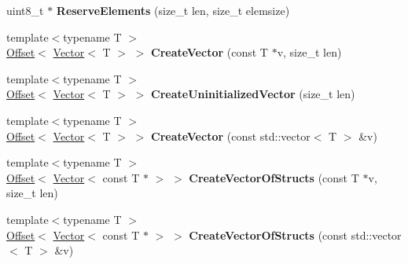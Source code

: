 \begin{DoxyCompactItemize}
uint8\+\_\+t $\ast$ {\bfseries Reserve\+Elements} (size\+\_\+t len, size\+\_\+t elemsize)
\item 
\mbox{\label{classflatbuffers_1_1FlatBufferBuilder_a2cca5c89246a53e80e6ad9487f4c36f3}} 
{\footnotesize template$<$typename T $>$ }\\\hyperlink{structflatbuffers_1_1Offset}{Offset}$<$ \hyperlink{classflatbuffers_1_1Vector}{Vector}$<$ T $>$ $>$ {\bfseries Create\+Vector} (const T $\ast$v, size\+\_\+t len)
\item 
\mbox{\label{classflatbuffers_1_1FlatBufferBuilder_ac85de2e957af13fc3a1651f1f0491952}} 
{\footnotesize template$<$typename T $>$ }\\\hyperlink{structflatbuffers_1_1Offset}{Offset}$<$ \hyperlink{classflatbuffers_1_1Vector}{Vector}$<$ T $>$ $>$ {\bfseries Create\+Uninitialized\+Vector} (size\+\_\+t len)
\item 
\mbox{\label{classflatbuffers_1_1FlatBufferBuilder_af715dd24dd37cb0151dc7a980ad0f207}} 
{\footnotesize template$<$typename T $>$ }\\\hyperlink{structflatbuffers_1_1Offset}{Offset}$<$ \hyperlink{classflatbuffers_1_1Vector}{Vector}$<$ T $>$ $>$ {\bfseries Create\+Vector} (const std\+::vector$<$ T $>$ \&v)
\item 
\mbox{\label{classflatbuffers_1_1FlatBufferBuilder_afede51fd9c32d146cbb1832f57c5e1b7}} 
{\footnotesize template$<$typename T $>$ }\\\hyperlink{structflatbuffers_1_1Offset}{Offset}$<$ \hyperlink{classflatbuffers_1_1Vector}{Vector}$<$ const T $\ast$ $>$ $>$ {\bfseries Create\+Vector\+Of\+Structs} (const T $\ast$v, size\+\_\+t len)
\item 
\mbox{\label{classflatbuffers_1_1FlatBufferBuilder_a8704709a2e25ad04679212ee4126b1a1}} 
{\footnotesize template$<$typename T $>$ }\\\hyperlink{structflatbuffers_1_1Offset}{Offset}$<$ \hyperlink{classflatbuffers_1_1Vector}{Vector}$<$ const T $\ast$ $>$ $>$ {\bfseries Create\+Vector\+Of\+Structs} (const std\+::vector$<$ T $>$ \&v)
\item 
\mbox{\label{classflatbuffers_1_1FlatBufferBuilder_a0c9e507b373d598b51052fab4fa34912}} 

\end{DoxyCompactItemize}
